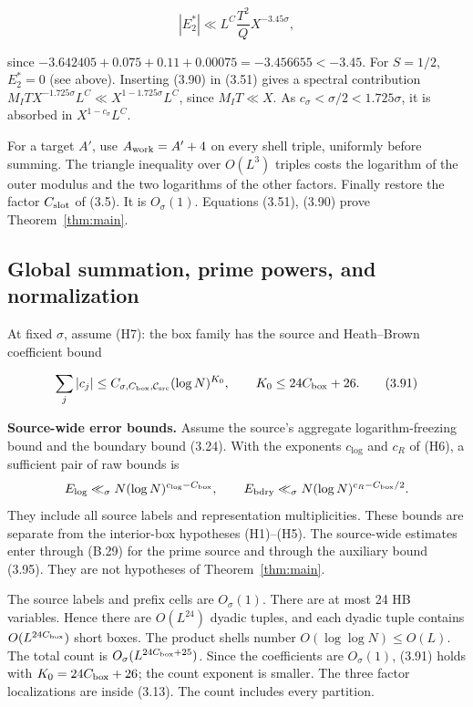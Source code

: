 \[
|E_2^*|\ll L^C\frac{T^2}{Q}X^{-3.45\sigma},
\tag{3.90}
\]

since $-3.642405+0.075+0.11+0.00075=-3.456655<-3.45$.
For $S=1/2$, $E_2^*=0$ (see above).
Inserting (3.90) in (3.51) gives a spectral contribution
$M_ITX^{-1.725\sigma}L^C\ll X^{1-1.725\sigma}L^C$, since $M_IT\ll X$.
As $c_\sigma<\sigma/2<1.725\sigma$, it is absorbed in $X^{1-c_\sigma}L^C$.

For a target $A'$, use $A_{\rm work}=A'+4$ on every shell
triple, uniformly before summing.
The triangle inequality over $O(L^3)$ triples costs
the logarithm of the outer modulus and the
two logarithms of the other factors.
Finally restore the factor $C_{\rm slot}$ of (3.5). It is $O_\sigma(1)$.
Equations (3.51), (3.90) prove Theorem~\ref{thm:main}.

\subsection{Global summation, prime powers, and normalization}\label{sec:pi-global}

At fixed $\sigma$, assume (H7): the box family has the
source and Heath--Brown coefficient bound

\[
\sum_j|c_j|\le C_{\sigma,C_{\rm box},\mathcal C_{\rm src}}(\log N)^{K_0},\qquad
K_0\le24C_{\rm box}+26.
\tag{3.91}
\]

\textbf{Source-wide error bounds.}
Assume the source's aggregate logarithm-freezing bound and the
boundary bound (3.24).
With the exponents $c_{\log}$ and $c_R$ of (H6), a sufficient pair of
raw bounds is
\[
 E_{\rm log}\ll_\sigma N(\log N)^{c_{\log}-C_{\rm box}},\qquad
 E_{\rm bdry}\ll_\sigma N(\log N)^{c_R-C_{\rm box}/2}.
\]
They include all source labels and representation multiplicities.
These bounds are separate from the interior-box hypotheses (H1)--(H5).
The source-wide estimates enter through (B.29) for the prime source and
through the auxiliary bound (3.95). They are not hypotheses of
Theorem~\ref{thm:main}.

The source labels and prefix cells are $O_\sigma(1)$. There are
at most 24 HB variables. Hence there are $O(L^{24})$ dyadic tuples, and
each dyadic tuple contains $O(L^{24C_{\rm box}})$ short boxes.
The product shells number $O(\log\log N)\le O(L)$.
The total count is $O_\sigma(L^{24C_{\rm box}+25})$. Since the
coefficients are $O_\sigma(1)$, (3.91) holds with
$K_0=24C_{\rm box}+26$; the count exponent is smaller.
The three factor localizations are inside (3.13).
The count includes every partition.

